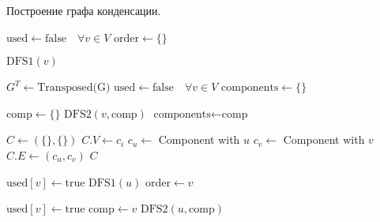 \documentclass[14pt, russian]{scrartcl}
\begin{document}
\begin{listing}[H]
\caption{Построение графа конденсации.}
\label{lst:condensation}
\begin{algorithmic}[1]
    \State $\text{used} \gets \text{false}\quad{} \forall v \in V$
    \State $\text{order} \gets \{\}$

            \State $\text{DFS1}(v)$
        \EndIf
    \EndFor

    \State $G^T \gets \text{Transposed(G)}$
    \State $\text{used} \gets \text{false}\quad{} \forall v \in V$
    \State $\text{components} \gets \{\}$

            \State $\text{comp} \gets \{\}$
            \State $\text{DFS2}(v, \text{comp})$
            \State $\text{components} \gets \text{comp}$
        \EndIf
    \EndFor

    \State $C \gets (\{\}, \{\})$
        \State $C.V \gets c_{i}$
    \EndFor
        \State $c_u \gets$ Component with $u$
        \State $c_v \gets$ Component with $v$
            \State $C.E \gets (c_u, c_v)$
        \EndIf
    \EndFor
    \State \Return $C$
\EndProcedure

    \State $\text{used}[v] \gets \text{true}$
            \State $\text{DFS1}(u)$
        \EndIf
    \EndFor
    \State $\text{order} \gets v$
\EndFunction

    \State $\text{used}[v] \gets \text{true}$
    \State $\text{comp} \gets v$
            \State $\text{DFS2}(u, \text{comp})$
        \EndIf
    \EndFor
\EndFunction
\end{algorithmic}
\end{listing}
\end{document}
